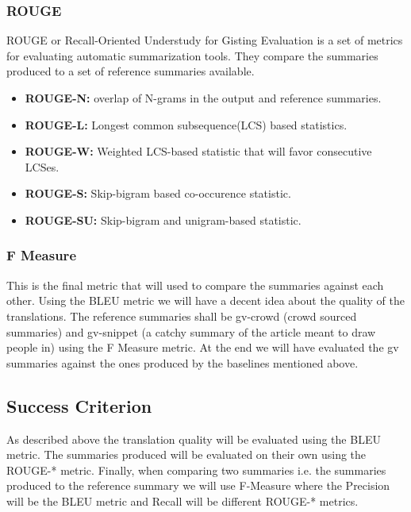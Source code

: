 \documentclass[12pt, a4paper]{article}
\begin{document}
\subsubsection*{ROUGE}
ROUGE or Recall-Oriented Understudy for Gisting Evaluation is a set of metrics for evaluating automatic summarization tools. They compare the summaries produced to a set of reference summaries available. 
\begin{itemize}
  \item \textbf{ROUGE-N:} overlap of N-grams in the output and reference summaries. 
  
  \item \textbf{ROUGE-L:} Longest common subsequence(LCS) based statistics. 
  
  \item \textbf{ROUGE-W:} Weighted LCS-based statistic that will favor consecutive LCSes.
  
  \item \textbf{ROUGE-S:} Skip-bigram based co-occurence statistic.
  
  \item \textbf{ROUGE-SU:} Skip-bigram and unigram-based statistic. 
\end{itemize}

\subsubsection*{F Measure}
This is the final metric that will used to compare the summaries against each other. Using the BLEU metric we will have a decent idea about the quality of the translations. The reference summaries shall be gv-crowd (crowd sourced summaries) and gv-snippet (a catchy summary of the article meant to draw people in) using the F Measure metric. At the end we will have evaluated the gv summaries against the ones produced by the baselines mentioned above. 

\subsection*{Success Criterion}
As described above the translation quality will be evaluated using the BLEU metric. The summaries produced will be evaluated on their own using the ROUGE-* metric. Finally, when comparing two summaries i.e. the summaries produced to the reference summary we will use F-Measure where the Precision will be the BLEU metric and Recall will be different ROUGE-* metrics. 
\end{document}
